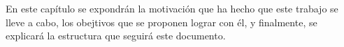 En este capítulo se expondrán la motivación que ha hecho que este trabajo
 se lleve a cabo, los obejtivos que se proponen lograr con él, y finalmente, se
 explicará la estructura que seguirá este documento.
